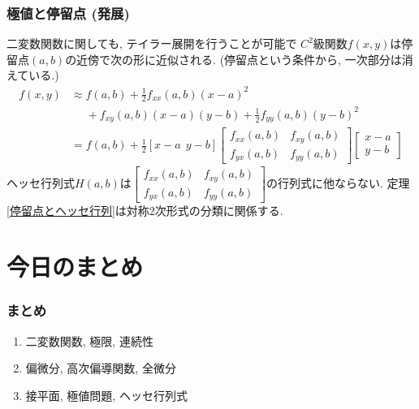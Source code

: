 

\begin{frame}
\frametitle{極値と停留点 (発展)}

二変数関数に関しても, テイラー展開を行うことが可能で
$C^2$級関数$f(x,y)$は停留点$(a,b)$の近傍で次の形に近似される. 
(停留点という条件から, 一次部分は消えている.)
\begin{align*}
f(x,y) & \approx f(a,b)+ \frac{1}{2}f_{xx}(a,b)(x-a)^2 \\
& \ \ \ \ \ \ +f_{xy}(a,b)(x-a)(y-b)+\frac{1}{2}f_{yy}(a,b)(y-b)^2 \\
& =  f(a,b)+ \frac{1}{2}[x-a \ \ y-b]
\begin{bmatrix} f_{xx}(a,b) & f_{xy}(a,b) \\ f_{yx}(a,b) & f_{yy}(a,b) \end{bmatrix}
\begin{bmatrix} x-a \\ y-b \end{bmatrix}
\end{align*}
ヘッセ行列式$H(a,b)$は$\begin{bmatrix} f_{xx}(a,b) & f_{xy}(a,b) \\ f_{yx}(a,b) & f_{yy}(a,b) \end{bmatrix}$の行列式に他ならない. 
定理\ref{停留点とヘッセ行列}は対称2次形式の分類に関係する. 

\end{frame}











\section{今日のまとめ}
\begin{frame}
\frametitle{まとめ}   


\begin{enumerate}
\item 二変数関数, 極限, 連続性
\item 偏微分, 高次偏導関数, 全微分
\item 接平面, 極値問題, ヘッセ行列式
\end{enumerate} 

\end{frame}
